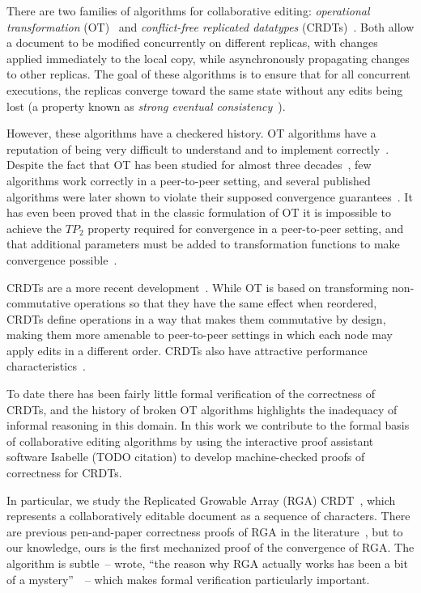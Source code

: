 \documentclass[acmlarge,review,anonymous]{acmart}\settopmatter{printfolios=true}
\begin{document}
There are two families of algorithms for collaborative editing: \emph{operational transformation}
(OT)~\cite{Ellis:1989ue,Ressel:1996wx,Oster:2006tr,Sun:1998vf,Sun:1998un,Suleiman:1998eu,Nichols:1995fd}
and \emph{conflict-free replicated datatypes}
(CRDTs)~\cite{Shapiro:2011wy,Roh:2011dw,Preguica:2009fz,Oster:2006wj,Weiss:2010hx,Nedelec:2013ky,Kleppmann:2016ve}.
Both allow a document to be modified concurrently on different replicas, with changes applied
immediately to the local copy, while asynchronously propagating changes to other replicas. The
goal of these algorithms is to ensure that for all concurrent executions, the replicas converge
toward the same state without any edits being lost (a property known as \emph{strong eventual
consistency}~\cite{Shapiro:2011un}).

However, these algorithms have a checkered history. OT algorithms have a reputation of being very
difficult to understand and to implement correctly~\cite{Spiewak:2010vw}. Despite the fact that OT
has been studied for almost three decades~\cite{Ellis:1989ue}, few algorithms work correctly in a
peer-to-peer setting, and several published algorithms were later shown to violate their supposed
convergence guarantees~\cite{Imine:2003ks,Imine:2006kn}. It has even been proved that in the classic
formulation of OT it is impossible to achieve the $\mathit{TP}_2$ property required for convergence
in a peer-to-peer setting, and that additional parameters must be added to transformation functions
to make convergence possible~\cite{Randolph:2015gj}.

CRDTs are a more recent development~\cite{Shapiro:2011un}. While OT is based on transforming
non-commutative operations so that they have the same effect when reordered, CRDTs define operations
in a way that makes them commutative by design, making them more amenable to peer-to-peer settings
in which each node may apply edits in a different order. CRDTs also have attractive performance
characteristics~\cite{Mehdi:2011ke}.

To date there has been fairly little formal verification of the correctness of CRDTs, and the
history of broken OT algorithms highlights the inadequacy of informal reasoning in this domain. In
this work we contribute to the formal basis of collaborative editing algorithms by using the
interactive proof assistant software Isabelle (TODO citation) to develop machine-checked proofs of
correctness for CRDTs.

In particular, we study the Replicated Growable Array (RGA) CRDT~\cite{Roh:2011dw}, which represents
a collaboratively editable document as a sequence of characters. There are previous pen-and-paper
correctness proofs of RGA in the literature~\cite{Attiya:2016kh,Kleppmann:2016ve,Roh:2009ws}, but to
our knowledge, ours is the first mechanized proof of the convergence of RGA. The algorithm is
subtle~-- \citet{Attiya:2016kh} wrote, ``the reason why RGA actually works has been a bit of a
mystery''~~-- which makes formal verification particularly important.
\end{document}
